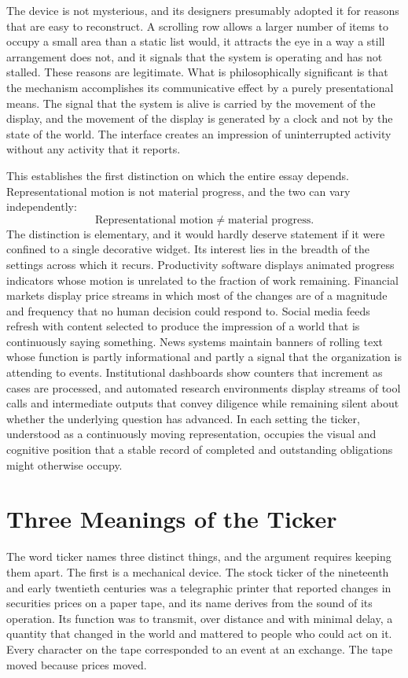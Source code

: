 \documentclass[11pt]{report}
\theoremstyle{definition}
\theoremstyle{remark}
\begin{document}
The device is not mysterious, and its designers presumably adopted it for reasons that are easy to reconstruct. A scrolling row allows a larger number of items to occupy a small area than a static list would, it attracts the eye in a way a still arrangement does not, and it signals that the system is operating and has not stalled. These reasons are legitimate. What is philosophically significant is that the mechanism accomplishes its communicative effect by a purely presentational means. The signal that the system is alive is carried by the movement of the display, and the movement of the display is generated by a clock and not by the state of the world. The interface creates an impression of uninterrupted activity without any activity that it reports.

This establishes the first distinction on which the entire essay depends. Representational motion is not material progress, and the two can vary independently:
\[
\text{Representational motion} \neq \text{material progress}.
\]
The distinction is elementary, and it would hardly deserve statement if it were confined to a single decorative widget. Its interest lies in the breadth of the settings across which it recurs. Productivity software displays animated progress indicators whose motion is unrelated to the fraction of work remaining. Financial markets display price streams in which most of the changes are of a magnitude and frequency that no human decision could respond to. Social media feeds refresh with content selected to produce the impression of a world that is continuously saying something. News systems maintain banners of rolling text whose function is partly informational and partly a signal that the organization is attending to events. Institutional dashboards show counters that increment as cases are processed, and automated research environments display streams of tool calls and intermediate outputs that convey diligence while remaining silent about whether the underlying question has advanced. In each setting the ticker, understood as a continuously moving representation, occupies the visual and cognitive position that a stable record of completed and outstanding obligations might otherwise occupy.

\section{Three Meanings of the Ticker}

The word ticker names three distinct things, and the argument requires keeping them apart. The first is a mechanical device. The stock ticker of the nineteenth and early twentieth centuries was a telegraphic printer that reported changes in securities prices on a paper tape, and its name derives from the sound of its operation. Its function was to transmit, over distance and with minimal delay, a quantity that changed in the world and mattered to people who could act on it. Every character on the tape corresponded to an event at an exchange. The tape moved because prices moved.
\end{document}
